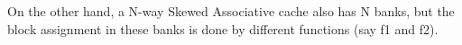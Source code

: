 \documentclass[12pt]{article}
\begin{document}
\vspace{\baselineskip}
{\fontsize{14pt}{16.8pt}\selectfont On the other hand, a N-way Skewed Associative cache also has N banks, but the block assignment in these banks is done by different functions (say f1 and f2). \par}\par


\vspace{\baselineskip}

\vspace{\baselineskip}

\vspace{\baselineskip}

\vspace{\baselineskip}

\vspace{\baselineskip}

\printbibliography
\end{document}

